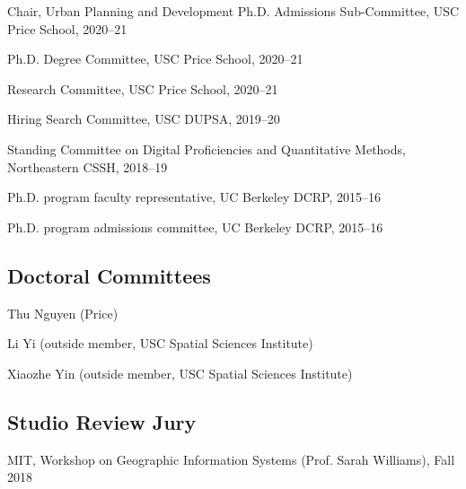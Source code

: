 \documentclass[12pt,letterpaper]{report}
\newcommand{\listitemspace}{0.25em}
\renewenvironment{itemize}
{\begin{list}{}{\setlength{\leftmargin}{0em}
            \setlength{\parskip}{0em}
            \setlength{\itemsep}{\listitemspace}
            \setlength{\parsep}{\listitemspace}}}
{\end{list}}
\begin{document}
    \begin{itemize}

        \item Chair, Urban Planning and Development Ph.D. Admissions Sub-Committee, USC Price School, 2020--21

        \item Ph.D. Degree Committee, USC Price School, 2020--21

        \item Research Committee, USC Price School, 2020--21

        \item Hiring Search Committee, USC DUPSA, 2019--20

        \item Standing Committee on Digital Proficiencies and Quantitative Methods, Northeastern CSSH, 2018--19

        \item Ph.D. program faculty representative, UC Berkeley DCRP, 2015--16

        \item Ph.D. program admissions committee, UC Berkeley DCRP, 2015--16

    \end{itemize}

    \subsection*{Doctoral Committees}

    \begin{itemize}

        \item Thu Nguyen (Price)

        \item Li Yi (outside member, USC Spatial Sciences Institute)

        \item Xiaozhe Yin (outside member, USC Spatial Sciences Institute)

    \end{itemize}

    \subsection*{Studio Review Jury}

    \begin{itemize}

        \item MIT, Workshop on Geographic Information Systems (Prof. Sarah Williams), Fall 2018

    \end{itemize}
\end{document}

